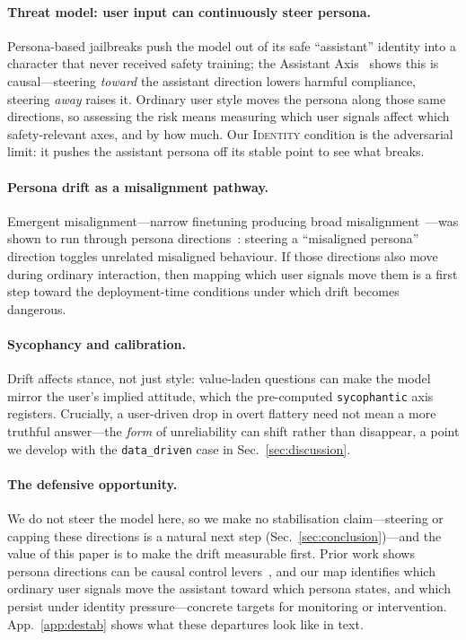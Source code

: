 \documentclass{article}
\newcommand{\ax}[1]{\texttt{#1}}   %
\begin{document}
\paragraph{Threat model: user input can continuously steer persona.} Persona-based jailbreaks push the model out of its safe ``assistant'' identity into a character that never received safety training; the Assistant Axis~\cite{assistantaxis} shows this is causal---steering \emph{toward} the assistant direction lowers harmful compliance, steering \emph{away} raises it. Ordinary user style moves the persona along those same directions, so assessing the risk means measuring which user signals affect which safety-relevant axes, and by how much. Our \textsc{Identity} condition is the adversarial limit: it pushes the assistant persona off its stable point to see what breaks.

\paragraph{Persona drift as a misalignment pathway.} Emergent misalignment---narrow finetuning producing broad misalignment~\cite{emergentmis}---was shown to run through persona directions~\cite{misalignment}: steering a ``misaligned persona'' direction toggles unrelated misaligned behaviour. If those directions also move during ordinary interaction, then mapping which user signals move them is a first step toward the deployment-time conditions under which drift becomes dangerous.

\paragraph{Sycophancy and calibration.} Drift affects stance, not just style: value-laden questions can make the model mirror the user's implied attitude, which the pre-computed \ax{sycophantic} axis registers. Crucially, a user-driven drop in overt flattery need not mean a more truthful answer---the \emph{form} of unreliability can shift rather than disappear, a point we develop with the \ax{data\_driven} case in Sec.~\ref{sec:discussion}.

\paragraph{The defensive opportunity.} We do not steer the model here, so we make no stabilisation claim---steering or capping these directions is a natural next step (Sec.~\ref{sec:conclusion})---and the value of this paper is to make the drift measurable first. Prior work shows persona directions can be causal control levers~\cite{personavectors,assistantaxis}, and our map identifies which ordinary user signals move the assistant toward which persona states, and which persist under identity pressure---concrete targets for monitoring or intervention. App.~\ref{app:destab} shows what these departures look like in text.
\end{document}
